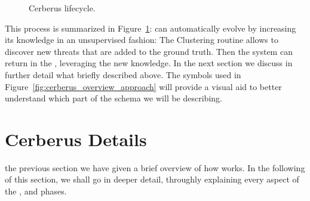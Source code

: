 \begin{figure}[!htp]
    \centering
    \caption{Cerberus lifecycle.}
    \label{fig:cerberus_lifecycle}
\end{figure}

This process is summarized in Figure~\ref{fig:cerberus_lifecycle}: \thesystem can automatically evolve by increasing its
knowledge in an unsupervised fashion: The Clustering routine allows to discover
new threats that are added to the ground truth. Then the system can return in
the , leveraging the new knowledge.
In the next section we discuss in further detail what briefly described above.
The symbols used in Figure~\ref{fig:cerberus_overview_approach} will provide a visual aid
to better understand which part of the schema we will be describing.

\newpage

\section{Cerberus Details} %
\label{sec:approach_details}
 the previous section we have given a brief overview of how
\thesystem works. In the following of this section, we shall go in deeper detail,
throughly explaining every aspect of the , 
and  phases.

